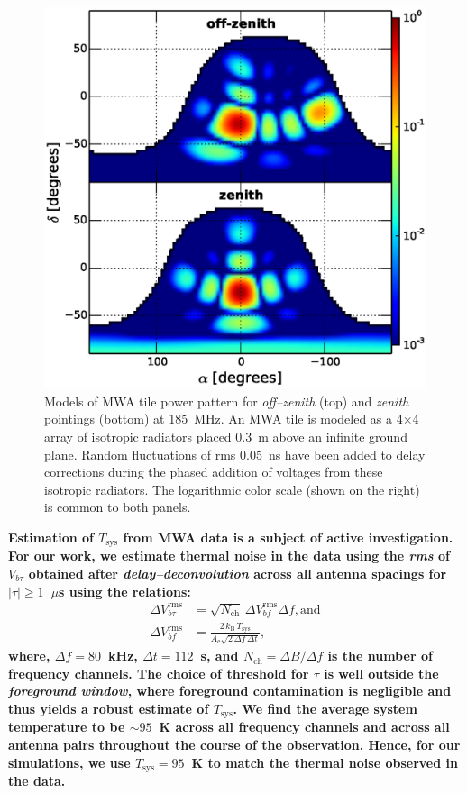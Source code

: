 \documentclass[preprint2,iop,numberedappendix]{emulateapj}
\begin{document}
\begin{figure}[htb]
\centering
\includegraphics[width=\linewidth]{fig5.eps}
\caption{Models of MWA tile power pattern for {\it off--zenith} (top) and {\it zenith} pointings (bottom) at 185~MHz. An MWA tile is modeled as a 4$\times$4 array of isotropic radiators placed 0.3~m above an infinite ground plane. Random fluctuations of rms 0.05~ns have been added to delay corrections during the phased addition of voltages from these isotropic radiators. The logarithmic color scale (shown on the right) is common to both panels. \label{fig:power_pattern}}
\end{figure}

{\bf Estimation of $T_\textrm{sys}$ from MWA data is a subject of active investigation. For our work, we estimate thermal noise in the data using the {\it rms} of $V_{b\tau}$ obtained after {\it delay--deconvolution} across all antenna spacings for $|\tau| \geq 1$~$\mu$s using the relations:
\begin{align}\label{eqn:Tsys}
  \Delta V_{b\tau}^\textrm{rms} &= \sqrt{N_\textrm{ch}}\,\Delta V_{bf}^\textrm{rms} \Delta f, \textrm{and} \\
  \Delta V_{bf}^\textrm{rms} &= \frac{2\,k_\textrm{B}\,T_\textrm{sys}}{A_\textrm{e}\sqrt{2\,\Delta f\,\Delta t}},
\end{align}
where, $\Delta f = 80$~kHz, $\Delta t = 112$~s, and $N_\textrm{ch}=\Delta B/\Delta f$ is the number of frequency channels. The choice of threshold for $\tau$ is well outside the {\it foreground window}, where foreground contamination is negligible and thus yields a robust estimate of $T_\textrm{sys}$. We find the average system temperature to be $\sim 95$~K across all frequency channels and across all antenna pairs throughout the course of the observation. Hence, for our simulations, we use $T_\textrm{sys}=95$~K to match the thermal noise observed in the data.} 
\end{document}
